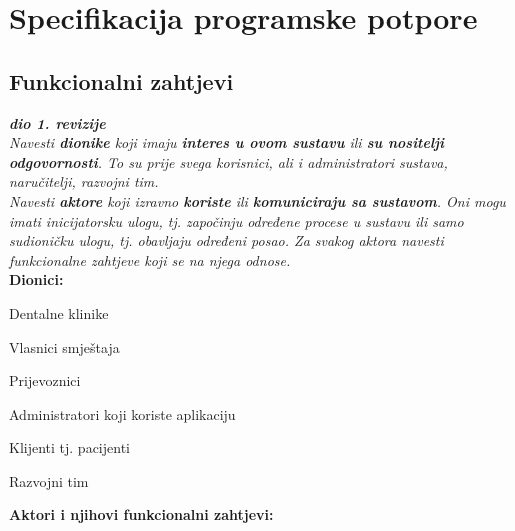 \chapter{Specifikacija programske potpore}
		
	\section{Funkcionalni zahtjevi}
			
			\textbf{\textit{dio 1. revizije}}\\
			
			\textit{Navesti \textbf{dionike} koji imaju \textbf{interes u ovom sustavu} ili  \textbf{su nositelji odgovornosti}. To su prije svega korisnici, ali i administratori sustava, naručitelji, razvojni tim.}\\
				
			\textit{Navesti \textbf{aktore} koji izravno \textbf{koriste} ili \textbf{komuniciraju sa sustavom}. Oni mogu imati inicijatorsku ulogu, tj. započinju određene procese u sustavu ili samo sudioničku ulogu, tj. obavljaju određeni posao. Za svakog aktora navesti funkcionalne zahtjeve koji se na njega odnose.}\\
			
			
			\noindent \textbf{Dionici:}
			
			\begin{packed_enum}
				
				\item Dentalne klinike
				\item Vlasnici smještaja			
				\item Prijevoznici
				\item Administratori koji koriste aplikaciju
				\item Klijenti tj. pacijenti
				\item Razvojni tim
				
				
			\end{packed_enum}
			
			\noindent \textbf{Aktori i njihovi funkcionalni zahtjevi:}
			
